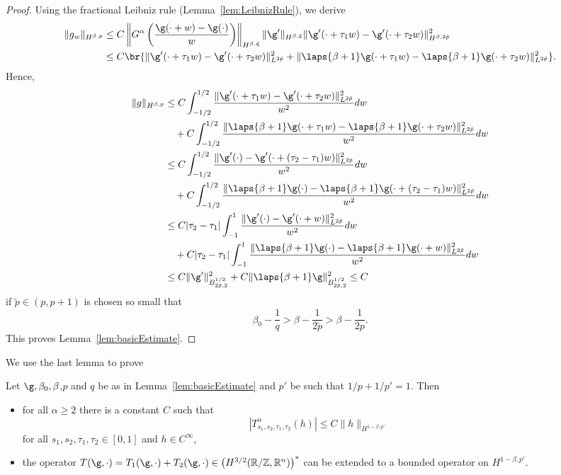 \begin{proof}
Using the fractional Leibniz rule (Lemma~\ref{lem:LeibnizRule}), we derive
\begin{align*}
 \|g_w\|_{H^{\beta,p}} &\leq C
\left\|G^{\alpha}\left(\frac {\g(\cdot +w)-\g(\cdot)}{w}\right)\right\|_{H^{\beta,\tilde q}}
\|\g'\|_{H^{\beta,\tilde q}}
\|\g'(\cdot + \tau_1 w) - \g'(\cdot + \tau_2 w )\|^2_{H^{\beta,2\tilde p}}
 \\
&  \leq C \br{\|\g'(\cdot + \tau_1 w) - \g'(\cdot + \tau_2 w )\|^2_{L^{2\tilde p}} 
+ \|\laps{\beta+1}\g(\cdot + \tau_1 w) - \laps{\beta+1}\g(\cdot + \tau_2 w )\|^2_{L^{2\tilde p}} }.
\end{align*}
Hence,
\begin{align*}
  \|g\|_{H^{\beta,p}} &\leq C
    \int_{-1/2}^{1/2} \frac{\|\g'(\cdot + \tau_1 w) - \g'(\cdot + \tau_2 w )\|^2_{L^{2\tilde p}} }{w^2} dw
  \\
  & \quad + C
  \int_{-1/2}^{1/2} 
    \frac {\|\laps{\beta+1}\g(\cdot + \tau_1 w) - \laps{\beta+1}\g(\cdot + \tau_2 w )\|^2_{L^{2\tilde p}}}
  {w^2} dw
\\
&\leq C
\int_{-1/2}^{1/2} \frac{\|\g'(\cdot) - \g'(\cdot + (\tau_2 - \tau_1) w )\|^2_{L^{2\tilde p}} }{w^2} dw
 \\
& \quad + C
  \int_{-1/2}^{1/2} \frac {\|\laps{\beta+1}\g(\cdot) - \laps{\beta+1} \g(\cdot + (\tau_2 - \tau_1) w )\|^2_{L^{2\tilde p}} }{w^2} dw
\\
&\leq C |\tau_2 - \tau_1|
\int_{-1}^{1} \frac{\|\g'(\cdot) - \g'(\cdot +  w )\|^2_{L^{2\tilde p}} }{w^2} dw
 \\
& \quad + C |\tau_2-\tau_1|
  \int_{-1}^{1} \frac {\|\laps{\beta+1}\g(\cdot) - \laps{\beta+1} \g(\cdot +  w )\|^2_{L^{2\tilde p}} }{w^2} dw
\\
& \leq C \|\g'\|_{B^{1/2}_{2\tilde p,2}}^2 
 + C \|\laps{\beta+1}\g\|^2_{B^{1/2}_{2\tilde p,2}} \leq C
\end{align*}
if $\tilde p\in(p,p+1)$ is chosen so small that
\begin{equation*}
  \beta_0 - \frac 1 q > \beta - \frac 1 {2\tilde p} > \beta - \frac 1 {2p}.
\end{equation*}
This proves Lemma~\ref{lem:basicEstimate}.
\end{proof}

We use the last lemma to prove
\begin{corollary} \label{cor:basicEstimate}
 Let $\g, \beta_0, \beta$,$p$ and $q$ be as in Lemma~\ref{lem:basicEstimate} and $p'$ 
 be such that $1/p + 1/p' =1$. Then
\begin{itemize}
 \item for all $\alpha\ge2$ there is a constant $C$
  such that
  \begin{equation*}
   | T^{\alpha}_{s_1, s_2 , \tau_1, \tau_2} (h) | \leq C \|h\|_{H^{1-\beta,p'}}
  \end{equation*}
  for all $s_1, s_2, \tau_1, \tau_2 \in [0,1]$ and $h \in C^\infty$,
\item the operator
 $T(\g,\cdot) = T_1(\g,\cdot) + T_2(\g,\cdot) \in \left(H^{3/2}(\mathbb R / \mathbb Z, \mathbb R^n )\right)^\ast$
 can be extended to a bounded  operator on $ H^{1 - \beta,p'}$.
\end{itemize}
\end{corollary}

